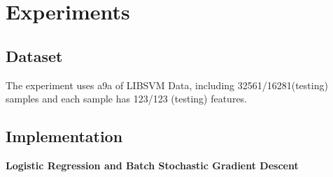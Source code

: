 \documentclass[journal, a4paper]{IEEEtran}
\begin{document}
\section{Experiments}
\subsection{Dataset}
The experiment uses a9a of LIBSVM Data, including 32561/16281(testing) samples and each sample has 123/123 (testing) features.

\subsection{Implementation}
\center \textbf{Logistic Regression and Batch Stochastic Gradient Descent}\\
\end{document}
